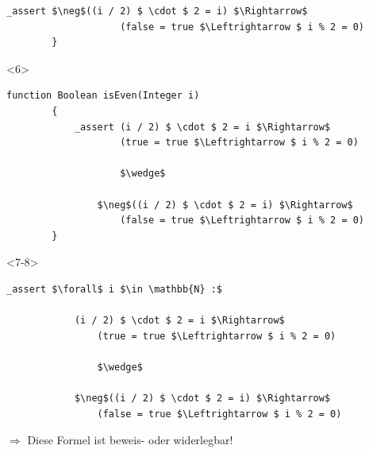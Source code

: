 \documentclass[t,svgnames]{beamer}
\begin{document}
\begin{frame}[fragile]
\begin{onlyenv}
\begin{lstlisting}[frame=lines,mathescape=true]
		    _assert $\neg$((i / 2) $ \cdot $ 2 = i) $\Rightarrow$
		        	(false = true $\Leftrightarrow $ i % 2 = 0)
		}
	\end{lstlisting}
	\end{onlyenv}
	
		\begin{onlyenv}<6>
	\begin{lstlisting}[frame=lines,mathescape=true]
		function Boolean isEven(Integer i)
		{
		    _assert (i / 2) $ \cdot $ 2 = i $\Rightarrow$
		        	(true = true $\Leftrightarrow $ i % 2 = 0)
		        	
		        	$\wedge$
		        	
		        $\neg$((i / 2) $ \cdot $ 2 = i) $\Rightarrow$
		        	(false = true $\Leftrightarrow $ i % 2 = 0)
		}
	\end{lstlisting}
	\end{onlyenv}
	
		\begin{onlyenv}
	\begin{lstlisting}[frame=lines,mathescape=true]
	_assert $\forall$ i $\in \mathbb{N} :$
		        
	        (i / 2) $ \cdot $ 2 = i $\Rightarrow$
	        	(true = true $\Leftrightarrow $ i % 2 = 0)
	        	
	        	$\wedge$
	        	
	        $\neg$((i / 2) $ \cdot $ 2 = i) $\Rightarrow$
	        	(false = true $\Leftrightarrow $ i % 2 = 0)
	\end{lstlisting}
	\end{onlyenv}
	
	\vspace{1cm}
	
	 {
		$\Rightarrow$ Diese Formel ist beweis- oder widerlegbar!
	}
\end{frame}
\end{document}
